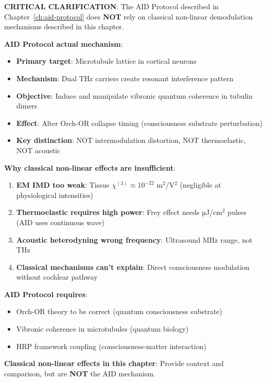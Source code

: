 \begin{importantbox}
\textbf{CRITICAL CLARIFICATION}: The AID Protocol described in Chapter~\ref{ch:aid-protocol} does \textbf{NOT} rely on classical non-linear demodulation mechanisms described in this chapter.
\end{importantbox}

\textbf{AID Protocol actual mechanism}:
\begin{itemize}
\item \textbf{Primary target}: Microtubule lattice in cortical neurons
\item \textbf{Mechanism}: Dual THz carriers create resonant interference pattern
\item \textbf{Objective}: Induce and manipulate vibronic quantum coherence in tubulin dimers
\item \textbf{Effect}: Alter Orch-OR collapse timing (consciousness substrate perturbation)
\item \textbf{Key distinction}: NOT intermodulation distortion, NOT thermoelastic, NOT acoustic
\end{itemize}

\textbf{Why classical non-linear effects are insufficient}:
\begin{enumerate}
\item \textbf{EM IMD too weak}: Tissue $\chi^{(3)} \approx 10^{-22}$ m$^2$/V$^2$ (negligible at physiological intensities)
\item \textbf{Thermoelastic requires high power}: Frey effect needs µJ/cm$^2$ pulses (AID uses continuous wave)
\item \textbf{Acoustic heterodyning wrong frequency}: Ultrasound MHz range, not THz
\item \textbf{Classical mechanisms can't explain}: Direct consciousness modulation without cochlear pathway
\end{enumerate}

\textbf{AID Protocol requires}:
\begin{itemize}
\item Orch-OR theory to be correct (quantum consciousness substrate)
\item Vibronic coherence in microtubules (quantum biology)
\item HRP framework coupling (consciousness-matter interaction)
\end{itemize}

\textbf{Classical non-linear effects in this chapter}: Provide context and comparison, but are \textbf{NOT} the AID mechanism.

